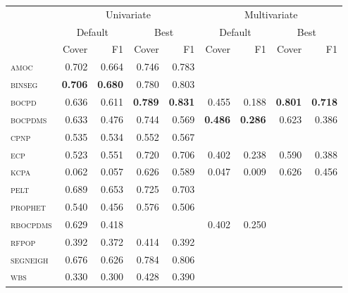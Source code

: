 \begin{tabular}{lrr|rrrr|rr}
 & \multicolumn{4}{c}{Univariate} & \multicolumn{4}{c}{Multivariate} \\\cmidrule(lr){2-5}\cmidrule(lr){6-9}
 & \multicolumn{2}{c}{Default} & \multicolumn{2}{c}{Best} & \multicolumn{2}{c}{Default} & \multicolumn{2}{c}{Best} \\\cmidrule(lr){2-3}\cmidrule(lr){4-5}\cmidrule(lr){6-7}\cmidrule(lr){8-9}
 & Cover & F1 & Cover & F1 & Cover & F1 & Cover & F1\\\cmidrule(r){1-1}\cmidrule(lr){2-5}\cmidrule(l){6-9}
\textsc{amoc}     & 0.702 & 0.664 & 0.746 & 0.783 &       &       &       &       \\
\textsc{binseg}   & \textbf{0.706} & \textbf{0.680} & 0.780 & 0.803 &       &       &       &       \\
\textsc{bocpd}    & 0.636 & 0.611 & \textbf{0.789} & \textbf{0.831} & 0.455 & 0.188 & \textbf{0.801} & \textbf{0.718} \\
\textsc{bocpdms}  & 0.633 & 0.476 & 0.744 & 0.569 & \textbf{0.486} & \textbf{0.286} & 0.623 & 0.386 \\
\textsc{cpnp}     & 0.535 & 0.534 & 0.552 & 0.567 &       &       &       &       \\
\textsc{ecp}      & 0.523 & 0.551 & 0.720 & 0.706 & 0.402 & 0.238 & 0.590 & 0.388 \\
\textsc{kcpa}     & 0.062 & 0.057 & 0.626 & 0.589 & 0.047 & 0.009 & 0.626 & 0.456 \\
\textsc{pelt}     & 0.689 & 0.653 & 0.725 & 0.703 &       &       &       &       \\
\textsc{prophet}  & 0.540 & 0.456 & 0.576 & 0.506 &       &       &       &       \\
\textsc{rbocpdms} & 0.629 & 0.418 &       &       & 0.402 & 0.250 &       &       \\
\textsc{rfpop}    & 0.392 & 0.372 & 0.414 & 0.392 &       &       &       &       \\
\textsc{segneigh} & 0.676 & 0.626 & 0.784 & 0.806 &       &       &       &       \\
\textsc{wbs}      & 0.330 & 0.300 & 0.428 & 0.390 &       &       &       &       \\
\cmidrule(r){1-1}\cmidrule(lr){2-5}\cmidrule(l){6-9}
\end{tabular}
